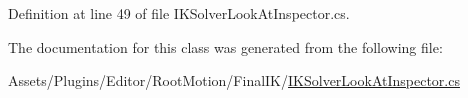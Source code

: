 Definition at line 49 of file I\+K\+Solver\+Look\+At\+Inspector.\+cs.



The documentation for this class was generated from the following file\+:\begin{DoxyCompactItemize}
\item 
Assets/\+Plugins/\+Editor/\+Root\+Motion/\+Final\+I\+K/\mbox{\hyperlink{_i_k_solver_look_at_inspector_8cs}{I\+K\+Solver\+Look\+At\+Inspector.\+cs}}\end{DoxyCompactItemize}
